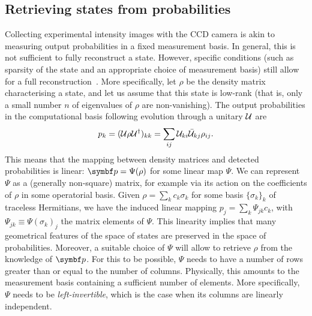 \subsection{Retrieving states from probabilities}

Collecting experimental intensity images with the \ac{CCD} camera is akin to measuring output probabilities in a fixed measurement basis.
In general, this is not sufficient to fully reconstruct a state.
However, specific conditions (such as sparsity of the state and an appropriate choice of measurement basis) still allow for a full reconstruction~\cite{banchi2018multiphoton}.
More specifically, let $\rho$ be the density matrix characterising a state, and let us assume that this state is low-rank (that is, only a small number $n$ of eigenvalues of $\rho$ are non-vanishing).
The output probabilities in the computational basis following evolution through a unitary ${\mathcal{U}}$ are
\begin{equation}
	p_k = ({\mathcal{U}}\rho{\mathcal{U}}^\dagger)_{kk}
	    = \sum_{ij}{\mathcal{U}}_{ki}\bar{{\mathcal{U}}}_{kj}\rho_{ij}.
\end{equation}
This means that the mapping between density matrices and detected probabilities is linear: $\bs p=\Psi(\rho)$ for some linear map $\Psi$.
We can represent $\Psi$ as a (generally non-square) matrix, for example via its action on the coefficients of $\rho$ in some operatorial basis.
Given $\rho=\sum_k c_k \sigma_k$ for some basis $\{\sigma_k\}_k$ of traceless Hermitians, we have the induced linear mapping $p_j = \sum_k \Psi_{jk}c_k$, with $\Psi_{jk}\equiv\Psi(\sigma_k)_j$ the matrix elements of $\Psi$.
This linearity implies that many geometrical features of the space of states are preserved in the space of probabilities. Moreover, a suitable choice of $\Psi$ will allow to retrieve $\rho$ from the knowledge of $\bs p$.
For this to be possible, $\Psi$ needs to have a number of rows greater than or equal to the number of columns. Physically, this amounts to the measurement basis containing a sufficient number of elements. More specifically, $\Psi$ needs to be \emph{left-invertible}, which is the case when its columns are linearly independent.

